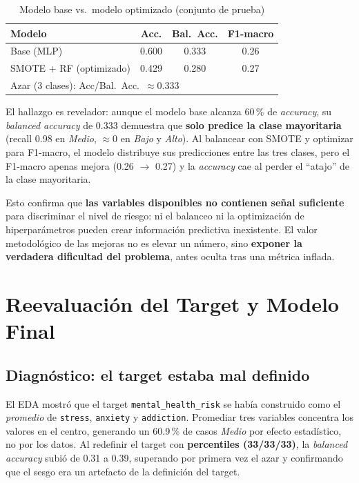 \documentclass[11pt,twocolumn]{article}
\begin{document}
\begin{table}[H]
\centering
\caption{Modelo base vs.\ modelo optimizado (conjunto de prueba)}
\small
\begin{tabular}{lccc}
\toprule
\textbf{Modelo} & \textbf{Acc.} & \textbf{Bal.\ Acc.} & \textbf{F1-macro} \\
\midrule
\rowcolor{lightrow} Base (MLP)             & 0.600 & 0.333 & 0.26 \\
SMOTE + RF (optimizado)                    & 0.429 & 0.280 & 0.27 \\
\bottomrule
\multicolumn{4}{l}{\footnotesize Azar (3 clases): Acc/Bal.\ Acc.\ $\approx 0.333$} \\
\end{tabular}
\end{table}

El hallazgo es revelador: aunque el modelo base alcanza 60\,\% de
\textit{accuracy}, su \textit{balanced accuracy} de 0.333 demuestra que
\textbf{solo predice la clase mayoritaria} (recall 0.98 en \textit{Medio},
$\approx$0 en \textit{Bajo} y \textit{Alto}). Al balancear con SMOTE y
optimizar para F1-macro, el modelo distribuye sus predicciones entre las
tres clases, pero el F1-macro apenas mejora (0.26 $\rightarrow$ 0.27) y
la \textit{accuracy} cae al perder el ``atajo'' de la clase mayoritaria.

Esto confirma que \textbf{las variables disponibles no contienen se\~nal
suficiente} para discriminar el nivel de riesgo: ni el balanceo ni la
optimizaci\'on de hiperpar\'ametros pueden crear informaci\'on
predictiva inexistente. El valor metodol\'ogico de las mejoras no es
elevar un n\'umero, sino \textbf{exponer la verdadera dificultad del
problema}, antes oculta tras una m\'etrica inflada.

\section{Reevaluaci\'on del Target y Modelo Final}

\subsection{Diagn\'ostico: el target estaba mal definido}

El EDA mostr\'o que el target \texttt{mental\_health\_risk} se hab\'ia
construido como el \emph{promedio} de \texttt{stress}, \texttt{anxiety} y
\texttt{addiction}. Promediar tres variables concentra los valores en el
centro, generando un 60.9\,\% de casos \textit{Medio} por efecto
estad\'istico, no por los datos. Al redefinir el target con
\textbf{percentiles (33/33/33)}, la \textit{balanced accuracy} subi\'o de
0.31 a 0.39, superando por primera vez el azar y confirmando que el sesgo
era un artefacto de la definici\'on del target.
\end{document}
